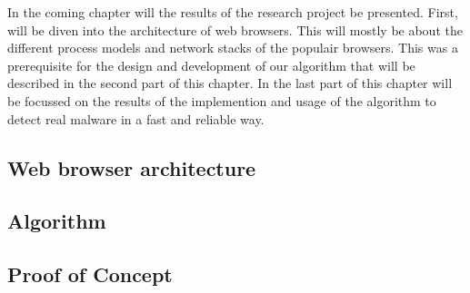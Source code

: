 
In the coming chapter will the results of the research project be presented. First, will be diven into the architecture of web browsers. This will mostly be about the different process models and network stacks of the populair browsers. This was a prerequisite for the design and development of our algorithm that will be described in the second part of this chapter. In the last part of this chapter will be focussed on the results of the implemention and usage of the algorithm to detect real malware  in a fast and reliable way.

\subsection{Web browser architecture}


\subsection{Algorithm}


\subsection{Proof of Concept}

